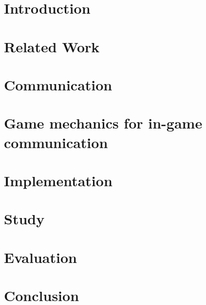 \section{Introduction}
\label{section:Introduction}



\section{Related Work}
\label{section:Related Work}



\section{Communication}
\label{section:Communication}



\section{Game mechanics for in-game communication}
\label{section:Game mechanics for in-game communication}



\section{Implementation}
\label{section:Implementation}


\section{Study}
\label{section:Study}



\section{Evaluation}
\label{section:Evaluation}



\section{Conclusion}
\label{section:Conclusion}

